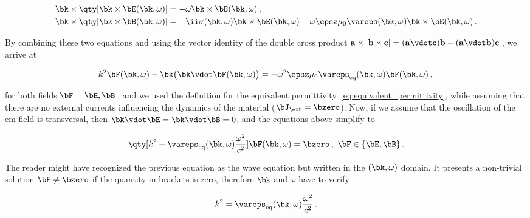 \begin{subequations}
    \label{eq:wave_equation}
    \begin{align}
        \bk \times \qty[\bk \times \bE(\bk,\omega)] &= - \omega \bk \times \bB(\bk,\omega)\,, \label{subeq:Faradays_law_crossed}\\
        \bk \times \qty[\bk \times \bB(\bk,\omega)] &= -\ii \sigma(\bk,\omega) \bk \times \bE(\bk,\omega) - \omega \epsz \mu_0 \vareps(\bk,\omega) \bk \times \bE(\bk,\omega)\,.\label{subeq:Amperes_law_crossed}
    \end{align}
\end{subequations}

\noindent By combining these two equations and using the vector identity of the double cross product $\mathbf{a} \times [\mathbf{b} \times \mathbf{c}] = (\mathbf{a} \vdot \mathbf{c}) \mathbf{b} - (\mathbf{a} \vdot \mathbf{b}) \mathbf{c}$\,, we arrive at

\begin{equation}
    k^2 \bF(\bk,\omega) - \bk \big(\bk \vdot \bF(\bk,\omega)\big) = -\omega^2 \epsz \mu_0 \vareps_{\text{eq}}(\bk,\omega) \bF(\bk,\omega) \label{subeq:wave_equation_F}\,,\\
\end{equation}

\noindent for both fields $\bF = \bE, \bB$\,, and we used the definition for the equivalent permittivity~\eqref{eq:equivalent_permittivity}, while assuming that there are no external currents influencing the dynamics of the material ($\bJ_\ext = \bzero$).
Now, if we assume that the oscillation of the \gls{em} field is transversal, then $\bk \vdot \bE = \bk \vdot \bB = 0$, and the equations above simplify to

\begin{equation}
    \qty[k^2 - \vareps_{\text{eq}}(\bk,\omega) \frac{\omega^2}{c^2}] \bF (\bk,\omega) = \bzero\,,\,\, \bF \in \{\bE, \bB\}\,.
\end{equation}

\noindent The reader might have recognized the previous equation as the wave equation but written in the $(\bk,\omega)$ domain.
It presents a non-trivial solution $\bF \neq \bzero$ if the quantity in brackets is zero, therefore $\bk$ and $\omega$ have to verify

\begin{equation}
    k^2 = \vareps_{\text{eq}}(\bk,\omega) \frac{\omega^2}{c^2}\,.
\end{equation}

